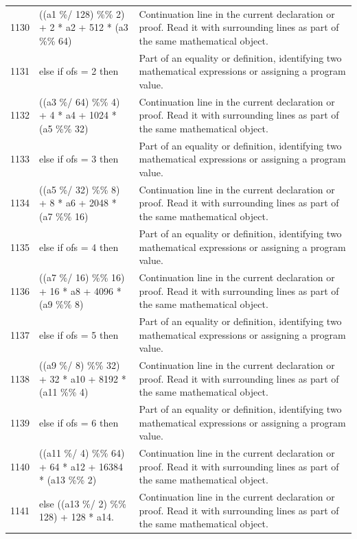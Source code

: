 \documentclass[10pt]{article}
\begin{document}
\begin{longtable}{r L{0.53\textwidth} L{0.37\textwidth}}
1130 & {\ttfamily\scriptsize     ((a1 \%/ 128) \%\% 2) + 2 * a2 + 512 * (a3 \%\% 64)} & Continuation line in the current declaration or proof.  Read it with surrounding lines as part of the same mathematical object. \\
1131 & {\ttfamily\scriptsize   else if ofs = 2 then} & Part of an equality or definition, identifying two mathematical expressions or assigning a program value. \\
1132 & {\ttfamily\scriptsize     ((a3 \%/ 64) \%\% 4) + 4 * a4 + 1024 * (a5 \%\% 32)} & Continuation line in the current declaration or proof.  Read it with surrounding lines as part of the same mathematical object. \\
1133 & {\ttfamily\scriptsize   else if ofs = 3 then} & Part of an equality or definition, identifying two mathematical expressions or assigning a program value. \\
1134 & {\ttfamily\scriptsize     ((a5 \%/ 32) \%\% 8) + 8 * a6 + 2048 * (a7 \%\% 16)} & Continuation line in the current declaration or proof.  Read it with surrounding lines as part of the same mathematical object. \\
1135 & {\ttfamily\scriptsize   else if ofs = 4 then} & Part of an equality or definition, identifying two mathematical expressions or assigning a program value. \\
1136 & {\ttfamily\scriptsize     ((a7 \%/ 16) \%\% 16) + 16 * a8 + 4096 * (a9 \%\% 8)} & Continuation line in the current declaration or proof.  Read it with surrounding lines as part of the same mathematical object. \\
1137 & {\ttfamily\scriptsize   else if ofs = 5 then} & Part of an equality or definition, identifying two mathematical expressions or assigning a program value. \\
1138 & {\ttfamily\scriptsize     ((a9 \%/ 8) \%\% 32) + 32 * a10 + 8192 * (a11 \%\% 4)} & Continuation line in the current declaration or proof.  Read it with surrounding lines as part of the same mathematical object. \\
1139 & {\ttfamily\scriptsize   else if ofs = 6 then} & Part of an equality or definition, identifying two mathematical expressions or assigning a program value. \\
1140 & {\ttfamily\scriptsize     ((a11 \%/ 4) \%\% 64) + 64 * a12 + 16384 * (a13 \%\% 2)} & Continuation line in the current declaration or proof.  Read it with surrounding lines as part of the same mathematical object. \\
1141 & {\ttfamily\scriptsize   else ((a13 \%/ 2) \%\% 128) + 128 * a14.} & Continuation line in the current declaration or proof.  Read it with surrounding lines as part of the same mathematical object. \\

\end{longtable}
\end{document}
